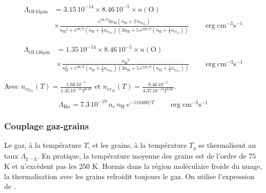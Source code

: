 \begin{equation}
\begin{split}
    \Lambda_{\mathrm{OI}\ 63 \mu \mathrm{m}} &= 3.15\,10^{-14} \times 8.46\,10^{-5} \times 
    n(\mathrm{O}) \\
    & \times \frac{e^{98/T} 3 n_\mathrm{H} (n_\mathrm{H} + \beta\, n_{\mathrm{cr}_{01}} ) }{{n_\mathrm{H}}^2+ e^{98/T}(n_\mathrm{H} + \frac{1}{2} n_{\mathrm{cr}_{01}} ) (3 n_\mathrm{H} + 5\, e^{228/T} (n_\mathrm{H} + \frac{1}{2} n_{\mathrm{cr}_{12}} )) } \qquad \operatorname{erg} \mathrm{cm}^{-3} \mathrm{s}^{-1}
\end{split}
\end{equation}

\begin{equation}
\begin{split}
    \Lambda_{\mathrm{OI}\ 146 \mu \mathrm{m}} &= 1.35\,10^{-14} \times 8.46\,10^{-5} \times 
    n(\mathrm{O}) \\
    & \times \frac{ {n_\mathrm{H}}^2 }{n_\mathrm{H}^2+ e^{98/T}(n_\mathrm{H} + \frac{1}{2} n_{\mathrm{cr}_{01}} ) (3 n_\mathrm{H} + 5\, e^{228/T} (n_\mathrm{H} + \frac{1}{2} n_{\mathrm{cr}_{12}} )) } \qquad \operatorname{erg} \mathrm{cm}^{-3} \mathrm{s}^{-1}
\end{split}
\end{equation}

Avec $n_{\mathrm{cr}_{01}}(T) = \frac{1.66\,10^{-5} }{1.35\,10^{-11} T^{0.49}} $ et $n_{\mathrm{cr}_{12}}(T) = \frac{8.46\,10^{-5} }{4.37\,10^{-12} T^{0.66}} $.

\begin{equation}
    \Lambda_{\mathrm{H}\alpha} = 7.3\, 10^{-19}\,n_e\,n_\mathrm{H}\,e^{-118400/T} \qquad \operatorname{erg} \mathrm{cm}^{-3} \mathrm{s}^{-1}
\end{equation}

\subsubsection{Couplage gaz-grains}

Le gaz, à la température $T$, et les grains, à la température $T_g$ se thermalisent au taux $\Lambda_{\mathrm{g}-\mathrm{g}}$. En pratique, la température moyenne des grains est de l'ordre de $75$ K et n'excèdent pas les $250$ K. Hormis dans la région moléculaire froide du nuage, la thermalisation avec les grains refroidit toujours le gaz. On utilise l'expression de \cite{Rollig2005}.

